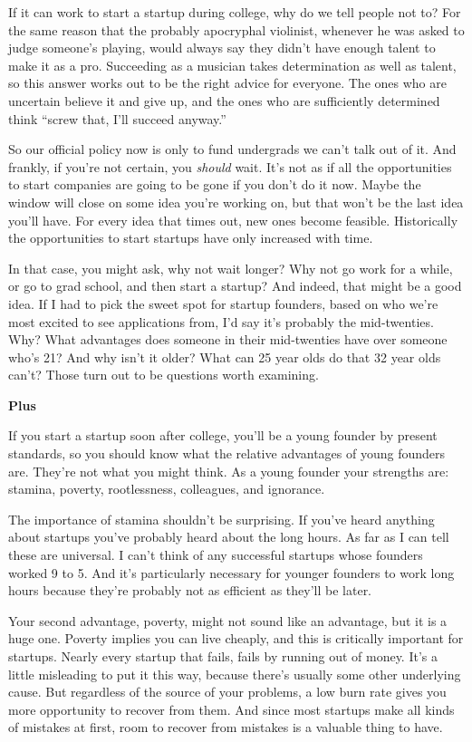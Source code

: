 If it can work to start a startup during college, why do we tell people
not to? For the same reason that the probably apocryphal violinist,
whenever he was asked to judge someone's playing, would always say they
didn't have enough talent to make it as a pro. Succeeding as a musician
takes determination as well as talent, so this answer works out to be
the right advice for everyone. The ones who are uncertain believe it and
give up, and the ones who are sufficiently determined think ``screw
that, I'll succeed anyway.''

So our official policy now is only to fund undergrads we can't talk out
of it. And frankly, if you're not certain, you \emph{should} wait. It's
not as if all the opportunities to start companies are going to be gone
if you don't do it now. Maybe the window will close on some idea you're
working on, but that won't be the last idea you'll have. For every idea
that times out, new ones become feasible. Historically the opportunities
to start startups have only increased with time.

In that case, you might ask, why not wait longer? Why not go work for a
while, or go to grad school, and then start a startup? And indeed, that
might be a good idea. If I had to pick the sweet spot for startup
founders, based on who we're most excited to see applications from, I'd
say it's probably the mid-twenties. Why? What advantages does someone in
their mid-twenties have over someone who's 21? And why isn't it older?
What can 25 year olds do that 32 year olds can't? Those turn out to be
questions worth examining.

\textbf{Plus}

If you start a startup soon after college, you'll be a young founder by
present standards, so you should know what the relative advantages of
young founders are. They're not what you might think. As a young founder
your strengths are: stamina, poverty, rootlessness, colleagues, and
ignorance.

The importance of stamina shouldn't be surprising. If you've heard
anything about startups you've probably heard about the long hours. As
far as I can tell these are universal. I can't think of any successful
startups whose founders worked 9 to 5. And it's particularly necessary
for younger founders to work long hours because they're probably not as
efficient as they'll be later.

Your second advantage, poverty, might not sound like an advantage, but
it is a huge one. Poverty implies you can live cheaply, and this is
critically important for startups. Nearly every startup that fails,
fails by running out of money. It's a little misleading to put it this
way, because there's usually some other underlying cause. But regardless
of the source of your problems, a low burn rate gives you more
opportunity to recover from them. And since most startups make all kinds
of mistakes at first, room to recover from mistakes is a valuable thing
to have.

